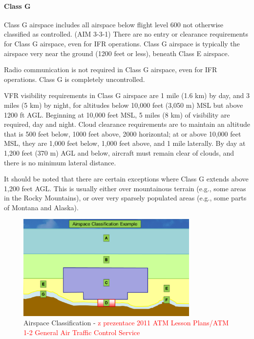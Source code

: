 \paragraph{Class G}
Class G airspace includes all airspace below flight level 600 not otherwise classified as controlled. (AIM 3-3-1) There are no entry or clearance requirements for Class G airspace, even for IFR operations. Class G airspace is typically the airspace very near the ground (1200 feet or less), beneath Class E airspace.

Radio communication is not required in Class G airspace, even for IFR operations. Class G is completely uncontrolled.

VFR visibility requirements in Class G airspace are 1 mile (1.6 km) by day, and 3 miles (5 km) by night, for altitudes below 10,000 feet (3,050 m) MSL but above 1200 ft AGL. Beginning at 10,000 feet MSL, 5 miles (8 km) of visibility are required, day and night. Cloud clearance requirements are to maintain an altitude that is 500 feet below, 1000 feet above, 2000 horizontal; at or above 10,000 feet MSL, they are 1,000 feet below, 1,000 feet above, and 1 mile laterally. By day at 1,200 feet (370 m) AGL and below, aircraft must remain clear of clouds, and there is no minimum lateral distance.

It should be noted that there are certain exceptions where Class G extends above 1,200 feet AGL. This is usually either over mountainous terrain (e.g., some areas in the Rocky Mountains), or over very sparsely populated areas (e.g., some parts of Montana and Alaska).




\begin{figure}[h]
    \centering
    \includegraphics[width=0.8\textwidth]{figures/classes.png}
    \caption{Airspace Classification - \textcolor{red}{z prezentace 2011 ATM Lesson Plans/ATM 1-2 General Air Traffic Control Service \cite {nolan}%
    }}
    \label{fig:classes}
\end{figure}

